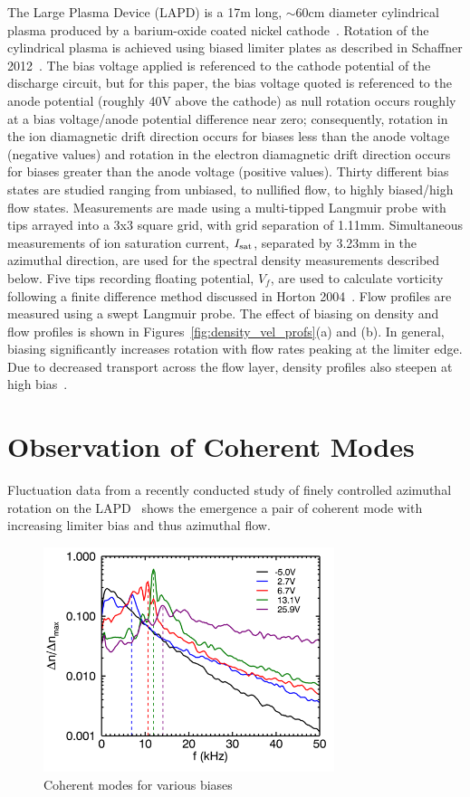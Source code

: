 \documentclass[aip,pop,amsmath,amssymb,reprint,superscriptaddress]{revtex4-1} %
\begin{document}
The Large Plasma Device (LAPD) is a 17m long, $\sim$60cm diameter cylindrical plasma produced by a barium-oxide coated nickel cathode~\cite{gek91}. Rotation of the cylindrical plasma is achieved using biased limiter plates as described in Schaffner 2012~\cite{schaffner12}. The bias voltage applied is referenced to the cathode potential of the discharge circuit, but for this paper, the bias voltage quoted is referenced to the anode potential (roughly 40V above the cathode) as null rotation occurs roughly at a bias voltage/anode potential difference near zero; consequently, rotation in the ion diamagnetic drift direction occurs for biases less than the anode voltage (negative values) and rotation in the electron diamagnetic drift direction occurs for biases greater than the anode voltage (positive values). Thirty different bias states are studied ranging from unbiased, to nullified flow, to highly biased/high flow states. Measurements are made using a multi-tipped Langmuir probe with tips arrayed into a 3x3 square grid, with grid separation of 1.11mm. Simultaneous measurements of ion saturation current, $I_{\rm sat}$, separated by 3.23mm in the azimuthal direction, are used for the spectral density measurements described below. Five tips recording floating potential, $V_{f}$, are used to calculate vorticity following a finite difference method discussed in Horton 2004~\cite{horton04}. Flow profiles are measured using a swept Langmuir probe. The effect of biasing on density and flow profiles is shown in Figures~\ref{fig:density_vel_profs}(a) and (b). In general, biasing significantly increases rotation with flow rates peaking at the limiter edge. Due to decreased transport across the flow layer, density profiles also steepen at high bias~\cite{schaffner12}.

\section{Observation of Coherent Modes}

Fluctuation data from a recently conducted study of finely controlled azimuthal rotation on the LAPD~\cite{schaffner12} shows the emergence a pair of coherent mode with increasing limiter bias and thus azimuthal flow.

\begin{figure}[!htbp]
\centerline{
\includegraphics[width=8.5cm]{dens_spec_limedge_zoom.png}}%
\caption{\label{fig:dens_spec_limedge_zoom} Coherent modes for various biases}
\end{figure}
\end{document}
